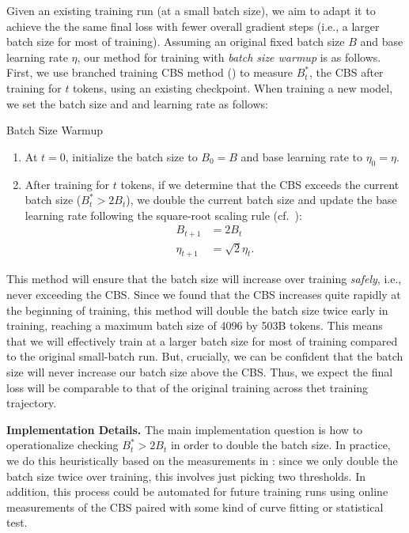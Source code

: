 \documentclass{article}
\renewcommand{\paragraph}[1]{\noindent \textbf{#1}}
\begin{document}
Given an existing training run (at a small batch size), we aim to adapt it to achieve the the same final loss with fewer overall gradient steps (i.e., a larger batch size for most of training).
Assuming an original fixed batch size $B$ and base learning rate $\eta$, our method for training with \emph{batch size warmup} is as follows.
First, we use branched training CBS method () to measure $B^*_t$, the CBS after training for $t$ tokens, using an existing checkpoint.
When training a new model, we set the batch size and and learning rate as follows:

\begin{methodbox}{Batch Size Warmup} \label{box:batch-size-warmup}
    \begin{enumerate}
        \item At $t = 0$, initialize the batch size to $B_0 = B$ and base learning rate to $\eta_0 = \eta$.
        \item After training for $t$ tokens, if we determine that the CBS exceeds the current batch size ($B^*_t > 2B_t$), we double the current batch size and update the base learning rate following the square-root scaling rule (cf.~):
        \begin{align*}
            B_{t+1} &= 2 B_t \\
            \eta_{t+1} &= \sqrt{2} \eta_t .
        \end{align*}
    \end{enumerate}
\end{methodbox}

This method will ensure that the batch size will increase over training \emph{safely}, i.e., never exceeding the CBS.
Since we found that the CBS increases quite rapidly at the beginning of training, this method will double the batch size twice early in training, reaching a maximum batch size of 4096 by 503B tokens.
This means that we will effectively train at a larger batch size for most of training compared to the original small-batch run.
But, crucially, we can be confident that the batch size will never increase our batch size above the CBS. Thus, we expect the final loss will be comparable to that of the original training across thet training trajectory.

\paragraph{Implementation Details.} The main implementation question is how to operationalize checking $B^*_t > 2B_t$ in order to double the batch size.
In practice, we do this heuristically based on the measurements in : since we only double the batch size twice over training, this involves just picking two thresholds.
In addition, this process could be automated for future training runs using online measurements of the CBS paired with some kind of curve fitting or statistical test.
\end{document}
